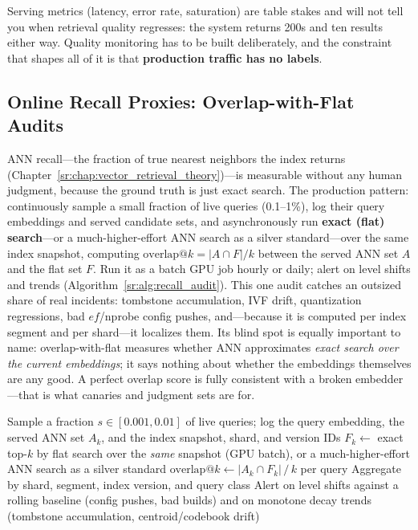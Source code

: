 Serving metrics (latency, error rate, saturation) are table stakes and will not tell you when retrieval quality regresses: the system returns 200s and ten results either way. Quality monitoring has to be built deliberately, and the constraint that shapes all of it is that \textbf{production traffic has no labels}.

\subsection{Online Recall Proxies: Overlap-with-Flat Audits}

ANN recall---the fraction of true nearest neighbors the index returns (Chapter~\ref{sr:chap:vector_retrieval_theory})---is measurable without any human judgment, because the ground truth is just exact search. The production pattern: continuously sample a small fraction of live queries (0.1--1\%), log their query embeddings and served candidate sets, and asynchronously run \textbf{exact (flat) search}---or a much-higher-effort ANN search as a silver standard---over the same index snapshot, computing $\text{overlap@}k = |A \cap F| / k$ between the served ANN set $A$ and the flat set $F$. Run it as a batch GPU job hourly or daily; alert on level shifts and trends (Algorithm~\ref{sr:alg:recall_audit}). This one audit catches an outsized share of real incidents: tombstone accumulation, IVF drift, quantization regressions, bad $ef$/nprobe config pushes, and---because it is computed per index segment and per shard---it localizes them. Its blind spot is equally important to name: overlap-with-flat measures whether ANN approximates \textit{exact search over the current embeddings}; it says nothing about whether the embeddings themselves are any good. A perfect overlap score is fully consistent with a broken embedder---that is what canaries and judgment sets are for.

\begin{algorithm}[H]
\caption{Online recall-proxy audit (overlap-with-flat)}
\label{sr:alg:recall_audit}
\begin{algorithmic}[1]
\STATE Sample a fraction $s \in [0.001, 0.01]$ of live queries; log the query embedding, the served ANN set $A_k$, and the index snapshot, shard, and version IDs
    \STATE $F_k \gets$ exact top-$k$ by flat search over the \emph{same} snapshot (GPU batch), or a much-higher-effort ANN search as a silver standard
    \STATE $\text{overlap@}k \gets |A_k \cap F_k| \,/\, k$ per query
    \STATE Aggregate by shard, segment, index version, and query class
\ENDFOR
\STATE Alert on level shifts against a rolling baseline (config pushes, bad builds) and on monotone decay trends (tombstone accumulation, centroid/codebook drift)
\end{algorithmic}
\end{algorithm}

